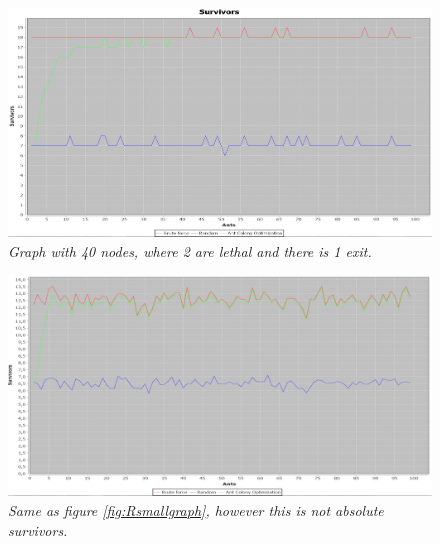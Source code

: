 \begin{figure} %
\hspace*{-1.5 cm}
\includegraphics[width=160mm]{images/40Nodes2Leathal2Exit.png}
\caption{\textit{Graph with 40 nodes, where 2 are lethal and there is 1 exit.}}
\label{fig:Rbiggraph}
\end{figure}

\begin{figure} %
\hspace*{-1.5 cm}
\includegraphics[width=160mm]{images/Float8Nodes2Leathal1Exitpng.png}
\caption{\textit{Same as figure \ref{fig:Rsmallgraph}, however this is not absolute survivors.}}
\label{fig:Rsmallgraphf}
\end{figure}

